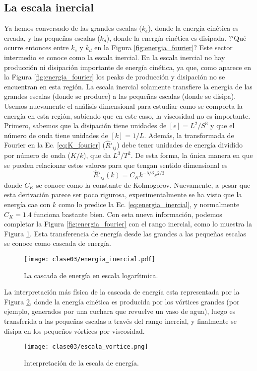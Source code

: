 \subsection*{La escala inercial}
Ya hemos conversado de las grandes escalas ($k_e$), donde la energía cinética es creada, y las pequeñas escalas ($k_d$), donde la energía cinética es disipada.
\mbox{?`}Qué ocurre entonces entre $k_e$ y $k_d$ en la Figura \ref{fig:energia_fourier}?
Este sector intermedio se conoce como la escala inercial. 
En la escala inercial no hay producción ni disipación importante de energía cinética, ya que, como aparece en la Figura \ref{fig:energia_fourier} los peaks de producción y disipación no se encuentran en esta región.
La escala inercial solamente transfiere la energía de las grandes escalas (donde se produce) a las pequeñas escalas (donde se disipa).
Usemos nuevamente el análisis dimensional para estudiar como se comporta la energía en esta región, sabiendo que en este caso, la viscosidad no es importante.
Primero, sabemos que la disipación tiene unidades de $[\epsilon] = L^2/S^3$ y que el número de onda tiene unidades de $[k] = 1/L$.
Además, la transformada de Fourier en la Ec. \eqref{eq:K_fourier} ($\hat{R}'_{ij}$) debe tener unidades de energía dividido por número de onda ($K/k$), que da $L^3/T^2$.
De esta forma, la única manera en que se pueden relacionar estos valores para que tengan sentido dimensional es
%
\begin{equation}\label{eq:energia_inercial}
\hat{R}'_{ij}(k) = C_K k^{-5/3}\epsilon^{2/3}
\end{equation}
%
donde $C_K$ se conoce como la constante de Kolmogorov.
Nuevamente, a pesar que esta derivación parece ser poco rigurosa, experimentalmente se ha visto que la energía cae con $k$ como lo predice la Ec. \eqref{eq:energia_inercial}, y normalmente $C_K=1.4$ funciona bastante bien.
Con esta nueva información, podemos completar la Figura \ref{fig:energia_fourier} con el rango inercial, como lo muestra la Figura \ref{fig:energia_inercial}.
Esta transferencia de energía desde las grandes a las pequeñas escalas se conoce como cascada de energía. 
%
\begin{figure}[h!]
\centering
\texttt{[image: clase03/energia\_inercial.pdf]}
\caption{La cascada de energía en escala logarítmica.}
\label{fig:energia_inercial}
\end{figure}

La interpretación más física de la cascada de energía esta representada por la Figura \ref{fig:escala_vortice}, donde la energía cinética es producida por los vórtices grandes (por ejemplo, generados por una cuchara que revuelve un vaso de agua), luego es transferida a las pequeñas escalas a través del rango inercial, y finalmente se disipa en los pequeños vórtices por viscosidad.
%
\begin{figure}[h!]
\centering
\texttt{[image: clase03/escala\_vortice.png]}
\caption{Interpretación de la escala de energía.}
\label{fig:escala_vortice}
\end{figure}

